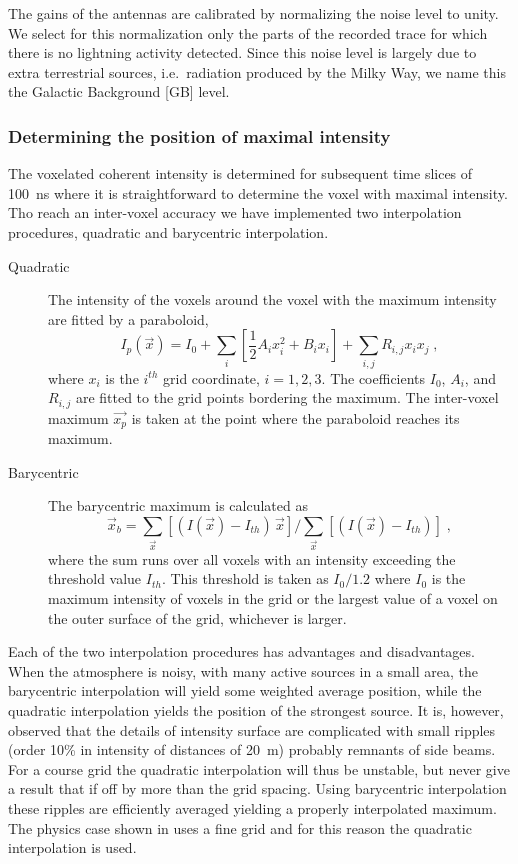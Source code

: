 The gains of the antennas are calibrated by normalizing the noise level to unity. We select for this normalization only the parts of the recorded trace for which there is no lightning activity detected.  Since this noise level is largely due to extra terrestrial sources, i.e.\ radiation produced by the Milky Way, we name this the Galactic Background [GB] level.

\subsubsection{Determining the position of maximal intensity}

The voxelated coherent intensity is determined for subsequent time slices of 100~ns where it is straightforward to determine the voxel with maximal intensity. Tho reach an inter-voxel accuracy we have implemented two interpolation procedures, quadratic and barycentric interpolation.

\begin{description}
\item[Quadratic] The intensity of the voxels around the voxel with the maximum intensity are fitted by a paraboloid,
    \begin{equation}
    I_p(\vec{x})=I_0 + \sum_i\left[\frac{1}{2} A_i x_i^2 + B_i x_i\right] + \sum_{i,j} R_{i,j} x_i x_j \;,
    \end{equation}
    where $x_i$ is the $i^{th}$ grid coordinate, $i=1,2,3$. The coefficients $I_0$, $A_i$, and $R_{i,j}$ are fitted to the grid points bordering the maximum. The inter-voxel maximum $\vec{x_p}$ is taken at the point where the paraboloid reaches its maximum.
\item[Barycentric] The barycentric maximum is calculated as
    \begin{equation}
    \vec{x}_b= \sum_{\vec{x}} \left[(I(\vec{x})-I_{th})\, \vec{x} \right] /  \sum_{\vec{x}} \left[(I(\vec{x})-I_{th}) \right] \;,
    \end{equation}
    where the sum runs over all voxels with an intensity exceeding the threshold value $I_{th}$. This threshold is taken as $I_0/1.2$ where $I_0$ is the maximum intensity of voxels in the grid or the largest value of a voxel on the outer surface of the grid, whichever is larger.
\end{description}

Each of the two interpolation procedures has advantages and disadvantages.
When the atmosphere is noisy, with many active sources in a small area, the barycentric interpolation will yield some weighted average position, while the quadratic interpolation yields the position of the strongest source.
It is, however, observed that the details of intensity surface are complicated with small ripples (order 10\% in intensity of distances of 20~m) probably remnants of side beams. For a course grid the quadratic interpolation will thus be unstable, but never give a result that if off by more than the grid spacing. Using barycentric interpolation these ripples are efficiently averaged yielding a properly interpolated maximum. The physics case shown in  uses a fine grid and for this reason the quadratic interpolation is used.


